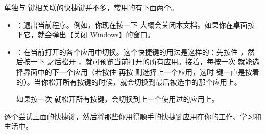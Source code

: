 单独与  键相关联的快捷键并不多，常用的有下面两个。

\begin{itemize}
  \item {}：退出当前程序。例如，你现在按一下  大概会关闭本文档。如果你在桌面按下它，就会弹出【关闭 Windows】的窗口。
  \item {}：在当前打开的各个应用中切换。这个快捷键的用法是这样的：先按住 ，然后按一下  之后松开 ，就可预览当前打开的所有应用。接着，每按一次  就能选择界面中的下一个应用（若按住  再按  则选择上一个应用，这时  键一直是按着的）。当你松开所有按键的时候，就会切换到最后被选中的那个应用上。

  如果按一次  就松开所有按键，会切换到上一个使用过的应用上。

\end{itemize}

\practice

逐个尝试上面的快捷键，然后将那些你用得顺手的快捷键应用在你的工作、学习和生活中。
